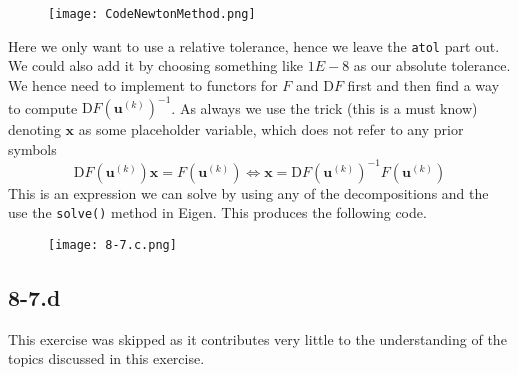 \documentclass{article}
\begin{document}
\begin{figure}[!hbt]
    \centering
\texttt{[image: CodeNewtonMethod.png]}
\end{figure}

\noindent Here we only want to use a relative tolerance, hence we leave the \verb|atol| part out. We could also add it by choosing something like $1E-8$ as our absolute tolerance. We hence need to implement to functors for $F$ and $\mathrm{D}F$ first and then find a way to compute $\mathrm{D}F\left(\mathbf{u}^{\left(k\right)}\right)^{-1}$. As always we use the trick (this is a must know) denoting $\mathbf{x}$ as some placeholder variable, which does not refer to any prior symbols
\begin{equation*}
    \mathrm{D}F\left(\mathbf{u}^{\left(k\right)}\right)\mathbf{x} = F\left(\mathbf{u}^{\left(k\right)}\right) \Longleftrightarrow \mathbf{x} = \mathrm{D}F\left(\mathbf{u}^{\left(k\right)}\right)^{-1}F\left(\mathbf{u}^{\left(k\right)}\right)
\end{equation*}
This is an expression we can solve by using any of the decompositions and the use the \verb|solve()| method in Eigen. This produces the following code.

\begin{figure}[!hbt]
    \centering
\texttt{[image: 8-7.c.png]}
\end{figure}
\subsection*{8-7.d}
This exercise was skipped as it contributes very little to the understanding of the topics discussed in this exercise.
\end{document}
